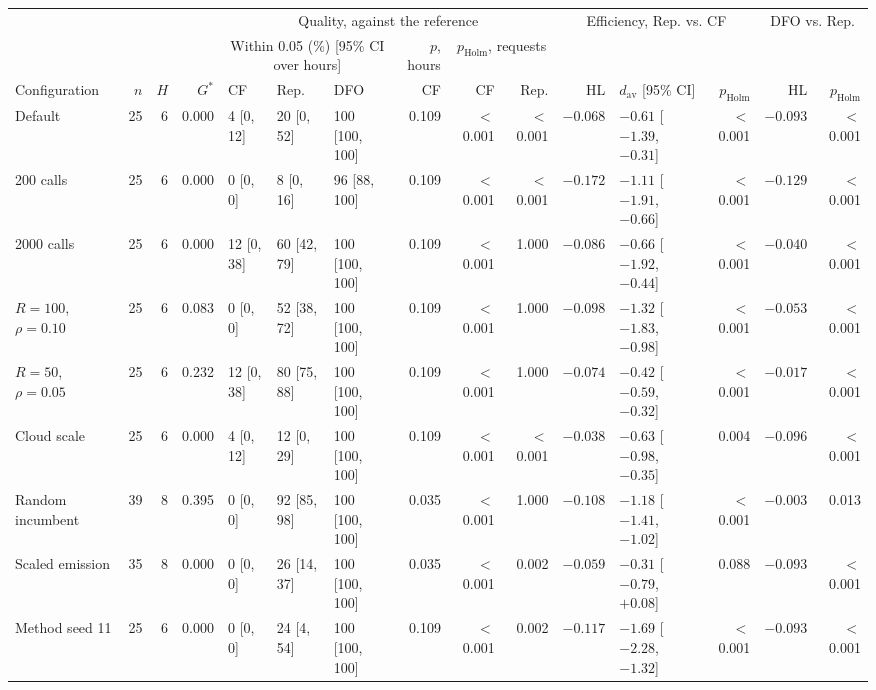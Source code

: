 \begin{tabular}{@{}lrrrlllrrrrlrrr@{}}
\toprule
 & & & & \multicolumn{6}{c}{Quality, against the reference} & \multicolumn{3}{c}{Efficiency, Rep. vs. CF} & \multicolumn{2}{c}{DFO vs. Rep.} \\
\cmidrule(lr){5-10}\cmidrule(lr){11-13}\cmidrule(l){14-15}
 & & & & \multicolumn{3}{c}{Within 0.05 (\%) [95\% CI over hours]} & $p$, hours & \multicolumn{2}{c}{$p_{\mathrm{Holm}}$, requests} & & & & & \\
Configuration & $n$ & $H$ & $G^{*}$ & CF & Rep. & DFO & CF & CF & Rep. & HL & $d_{\mathrm{av}}$ [95\% CI] & $p_{\mathrm{Holm}}$ & HL & $p_{\mathrm{Holm}}$ \\
\midrule
Default & 25 & 6 & 0.000 & 4 [0, 12] & 20 [0, 52] & 100 [100, 100] & 0.109 & $<$0.001 & $<$0.001 & $-0.068$ & $-0.61$ [$-1.39$, $-0.31$] & $<$0.001 & $-0.093$ & $<$0.001 \\
200 calls & 25 & 6 & 0.000 & 0 [0, 0] & 8 [0, 16] & 96 [88, 100] & 0.109 & $<$0.001 & $<$0.001 & $-0.172$ & $-1.11$ [$-1.91$, $-0.66$] & $<$0.001 & $-0.129$ & $<$0.001 \\
2000 calls & 25 & 6 & 0.000 & 12 [0, 38] & 60 [42, 79] & 100 [100, 100] & 0.109 & $<$0.001 & 1.000 & $-0.086$ & $-0.66$ [$-1.92$, $-0.44$] & $<$0.001 & $-0.040$ & $<$0.001 \\
$R=100$, $\rho=0.10$ & 25 & 6 & 0.083 & 0 [0, 0] & 52 [38, 72] & 100 [100, 100] & 0.109 & $<$0.001 & 1.000 & $-0.098$ & $-1.32$ [$-1.83$, $-0.98$] & $<$0.001 & $-0.053$ & $<$0.001 \\
$R=50$, $\rho=0.05$ & 25 & 6 & 0.232 & 12 [0, 38] & 80 [75, 88] & 100 [100, 100] & 0.109 & $<$0.001 & 1.000 & $-0.074$ & $-0.42$ [$-0.59$, $-0.32$] & $<$0.001 & $-0.017$ & $<$0.001 \\
Cloud scale & 25 & 6 & 0.000 & 4 [0, 12] & 12 [0, 29] & 100 [100, 100] & 0.109 & $<$0.001 & $<$0.001 & $-0.038$ & $-0.63$ [$-0.98$, $-0.35$] & 0.004 & $-0.096$ & $<$0.001 \\
Random incumbent & 39 & 8 & 0.395 & 0 [0, 0] & 92 [85, 98] & 100 [100, 100] & 0.035 & $<$0.001 & 1.000 & $-0.108$ & $-1.18$ [$-1.41$, $-1.02$] & $<$0.001 & $-0.003$ & 0.013 \\
Scaled emission & 35 & 8 & 0.000 & 0 [0, 0] & 26 [14, 37] & 100 [100, 100] & 0.035 & $<$0.001 & 0.002 & $-0.059$ & $-0.31$ [$-0.79$, $+0.08$] & 0.088 & $-0.093$ & $<$0.001 \\
Method seed 11 & 25 & 6 & 0.000 & 0 [0, 0] & 24 [4, 54] & 100 [100, 100] & 0.109 & $<$0.001 & 0.002 & $-0.117$ & $-1.69$ [$-2.28$, $-1.32$] & $<$0.001 & $-0.093$ & $<$0.001 \\
\bottomrule
\end{tabular}
